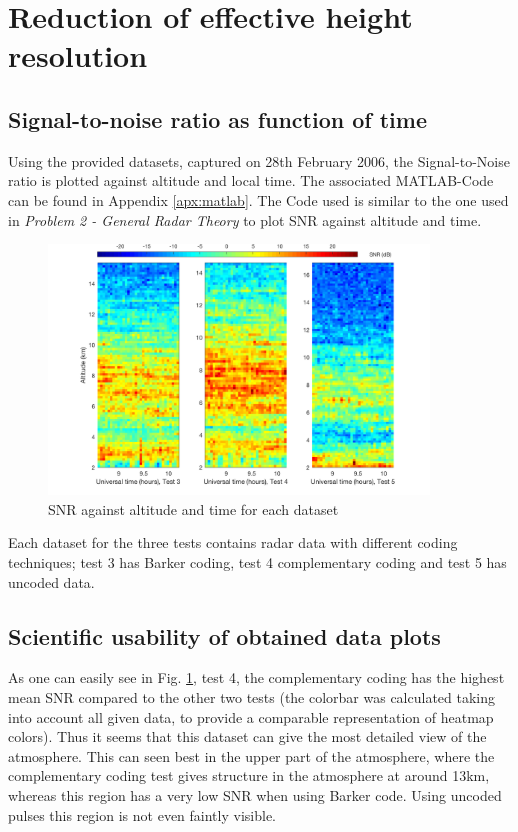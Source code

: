 \section{Reduction of effective height resolution}

\subsection{Signal-to-noise ratio as function of time}
Using the provided datasets, captured on 28th February 2006, the Signal-to-Noise ratio is plotted against altitude and local time. The associated MATLAB-Code can be found in Appendix \ref{apx:matlab}. The Code used is similar to the one used in \textit{Problem 2 - General Radar Theory} to plot SNR against altitude and time.

\begin{figure}[h!]
	\centering
	\includegraphics[width=0.9\textwidth]{images/task2_snr_plot}
	\caption{SNR against altitude and time for each dataset}
	\label{fig:snr}
\end{figure}

Each dataset for the three tests contains radar data with different coding techniques; test 3 has Barker coding, test 4 complementary coding and test 5 has uncoded data. \newline



\subsection{Scientific usability of obtained data plots}
As one can easily see in Fig. \ref{fig:snr}, test 4, the complementary coding has the highest mean SNR compared to the other two tests (the colorbar was calculated taking into account all given data, to provide a comparable representation of heatmap colors). Thus it seems that this dataset can give the most detailed view of the atmosphere. This can seen best in the upper part of the atmosphere, where the complementary coding test gives structure in the atmosphere at around 13km, whereas this region has a very low SNR when using Barker code. Using uncoded pulses this region is not even faintly visible.

